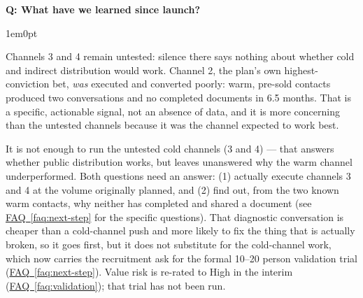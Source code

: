\documentclass[11pt,letterpaper]{article}
\newcounter{faqnum}
\newenvironment{faqpair}[1]{%
  \needspace{4\baselineskip}%
  \vspace{0.5em}%
  \refstepcounter{faqnum}%
  \noindent\textbf{\color{SectionBlue}Q\thefaqnum: #1}\par\nopagebreak[4]%
  \vspace{0.2em}%
  \begin{adjustwidth}{1em}{0pt}%
  \setlength{\parindent}{0pt}%
}{%
  \end{adjustwidth}%
  \vspace{0.5em}%
}
\newcommand{\faqref}[1]{\hyperref[#1]{FAQ~\ref*{#1}}}
\begin{document}
\begin{faqpair}{What have we learned since launch?}
  Channels 3 and 4 remain untested: silence there says nothing about whether cold and indirect distribution would work. Channel 2, the plan's own highest-conviction bet, \textit{was} executed and converted poorly: warm, pre-sold contacts produced two conversations and no completed documents in 6.5 months. That is a specific, actionable signal, not an absence of data, and it is more concerning than the untested channels because it was the channel expected to work best.

  It is not enough to run the untested cold channels (3 and 4) --- that answers whether public distribution works, but leaves unanswered why the warm channel underperformed. Both questions need an answer: (1) actually execute channels 3 and 4 at the volume originally planned, and (2) find out, from the two known warm contacts, why neither has completed and shared a document (see \faqref{faq:next-step} for the specific questions). That diagnostic conversation is cheaper than a cold-channel push and more likely to fix the thing that is actually broken, so it goes first, but it does not substitute for the cold-channel work, which now carries the recruitment ask for the formal 10--20 person validation trial (\faqref{faq:next-step}). Value risk is re-rated to High in the interim (\faqref{faq:validation}); that trial has not been run.
\end{faqpair}
\end{document}
